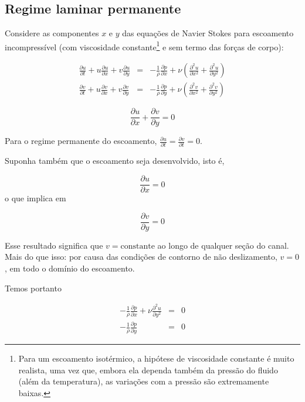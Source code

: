 \documentclass[a4paper,portuguese,10pt]{article}
\renewcommand{\D}{\partial}
\begin{document}
\subsection{Regime laminar permanente}

Considere as componentes $x$ e $y$ das equações de Navier Stokes para escoamento incompressível (com viscosidade constante\footnote{Para um escoamento isotérmico, a hipótese de viscosidade constante é muito realista, uma vez que, embora ela dependa também da pressão do fluido (além da temperatura), as variações com a pressão são extremamente baixas.} e sem termo das forças de corpo):

\begin{subequations}
  \begin{eqnarray}
    \frac{\D u}{\D t}+u\frac{\D u}{\D x}+v\frac{\D u}{\D y}&=&-\frac{1}{\rho}\frac{\D p}{\D x}+\nu\left(\frac{\D^2u}{\D x^2}+\frac{\D^2u}{\D y^2}\right)\\
    \frac{\D v}{\D t}+u\frac{\D v}{\D x}+v\frac{\D v}{\D y}&=&-\frac{1}{\rho}\frac{\D p}{\D y}+\nu\left(\frac{\D^2v}{\D x^2}+\frac{\D^2v}{\D y^2}\right)
  \end{eqnarray}
\end{subequations}

\begin{equation}
  \frac{\D u}{\D x} + \frac{\D v}{\D y} = 0
\end{equation}

Para o regime permanente do escoamento, $\frac{\D u}{\D t}=\frac{\D v}{\D t}=0$.

Suponha também que o escoamento seja desenvolvido, isto é,

\begin{equation}
  \frac{\D u}{\D x} = 0
\end{equation}
o que implica em

\begin{equation}
  \frac{\D v}{\D y} = 0
\end{equation}

Esse resultado significa que $v = \text{constante}$ ao longo de qualquer seção do canal. Mais do que isso: por causa das condições de contorno de não deslizamento, $v = 0$, em todo o domínio do escoamento.

Temos portanto

\begin{subequations}
  \begin{eqnarray}
    -\frac{1}{\rho}\frac{\D p}{\D x}+\nu\frac{\D^2u}{\D y^2}&=&0\\
    -\frac{1}{\rho}\frac{\D p}{\D y}&=&0
  \end{eqnarray}
  \label{eq:sistema_laminar}
\end{subequations}
\end{document}
